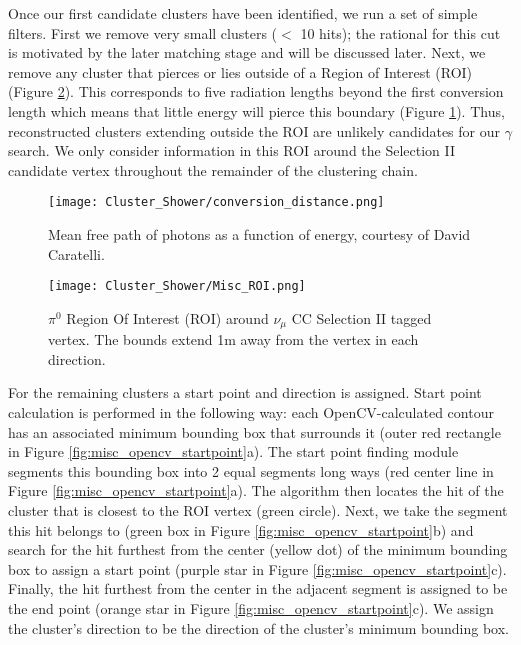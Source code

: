 \documentclass{article}
\begin{document}
\par Once our first candidate clusters have been identified, we run a set of simple filters.  First we remove very small clusters ($<$ 10 hits); the rational for this cut is motivated by the later matching stage and will be discussed later. Next, we remove any cluster that pierces or lies outside of a Region of Interest (ROI)  (Figure \ref{fig:roi}).  This corresponds to five radiation lengths beyond the first conversion length which means that little energy will pierce this boundary (Figure \ref{fig:davidc_conversion_distance}). Thus, reconstructed clusters extending outside the ROI are unlikely candidates for our $\gamma$ search. We only consider information in this ROI around the Selection II candidate vertex throughout the remainder of the clustering chain.

\begin{figure}[H]
\centering
\texttt{[image: Cluster\_Shower/conversion\_distance.png]}
\caption{ Mean free path of photons as a function of energy, courtesy of David Caratelli. }
\label{fig:davidc_conversion_distance}
\end{figure}


\begin{figure}[h!]
\centering
\texttt{[image: Cluster\_Shower/Misc\_ROI.png]}
\caption{$\pi^0$ Region Of Interest (ROI) around $\nu_\mu$ CC Selection II tagged  vertex. The bounds extend 1m away from the vertex in each direction. }
\label{fig:roi}
\end{figure}


\par For the remaining clusters a start point and direction is assigned. Start point calculation is performed in the following way: each OpenCV-calculated contour has an associated minimum bounding box \cite{bib:minAreaRect} that surrounds it (outer red rectangle in Figure \ref{fig:misc_opencv_startpoint}a). The start point finding module segments this bounding box into 2 equal segments long ways (red center line in Figure \ref{fig:misc_opencv_startpoint}a). The algorithm then locates the hit of the cluster that is closest to the ROI vertex (green circle).  Next, we take the segment this hit belongs to (green box in Figure \ref{fig:misc_opencv_startpoint}b) and search for the hit furthest from the center (yellow dot) of the minimum bounding box to assign a start point (purple star in Figure \ref{fig:misc_opencv_startpoint}c). Finally, the hit furthest from the center in the adjacent segment is assigned to be the end point (orange star in Figure \ref{fig:misc_opencv_startpoint}c). We assign the cluster's direction to be the direction of the cluster's minimum bounding box.
\end{document}
